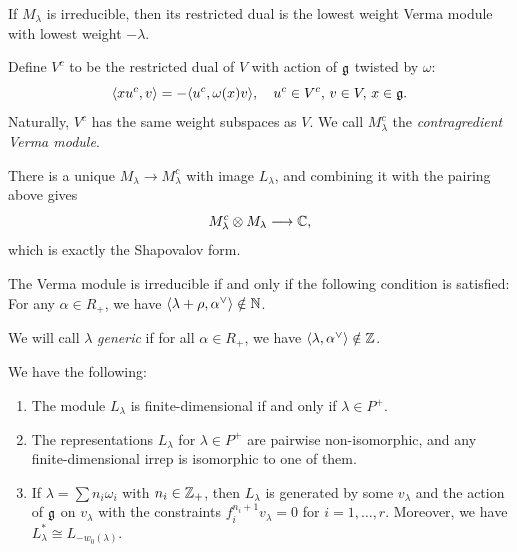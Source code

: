 \begin{prop}
  If $M_\lambda$ is irreducible, then
  its restricted dual is the lowest weight
  Verma module with lowest
  weight $-\lambda$.
\end{prop}

\begin{definition}
  Define
  $V^c$ to be the restricted dual of $V$
  with action of $\mathfrak{g}$ twisted by $\omega$:
  \[
    \langle xu^c, v \rangle
    = -\langle u^c, \omega(x) v \rangle,
    \quad u^c \in V^c,\, v \in V,\, x \in \mathfrak{g}.
  \]
  Naturally, $V^c$
  has the same weight subspaces as
  $V$. We call
  $M_\lambda^c$ the \emph{contragredient
  Verma module}.
\end{definition}

\begin{remark}
  There is a unique
  $M_\lambda \to M_\lambda^c$ with image
  $L_\lambda$, and
  combining it with the pairing above gives
  \[
    M^c_\lambda \otimes M_\lambda \longrightarrow \mathbb{C},
  \]
  which is exactly the Shapovalov form.
\end{remark}

\begin{theorem}
  The Verma module is irreducible if
  and only if the following condition is
  satisfied: For any $\alpha \in R_+$,
  we have
  $\langle \lambda + \rho, \alpha^\vee \rangle \notin \mathbb{N}$.
\end{theorem}

\begin{definition}
  We will call $\lambda$ \emph{generic}
  if for all $\alpha \in R_+$,
  we have $\langle \lambda, \alpha^\vee \rangle \notin \mathbb{Z}$.
\end{definition}

\begin{theorem}
  We have the following:
  \begin{enumerate}
    \item The module $L_\lambda$
      is finite-dimensional if and only if
      $\lambda \in P^+$.
    \item The representations $L_\lambda$
      for $\lambda \in P^+$ are pairwise
      non-isomorphic, and any finite-dimensional
      irrep
      is isomorphic to one of them.
    \item If $\lambda = \sum n_i \omega_i$
      with $n_i \in \mathbb{Z}_+$, then
      $L_\lambda$ is generated by some
      $v_\lambda$ and the action of
      $\mathfrak{g}$ on $v_\lambda$ with the
      constraints
      $f^{n_i + 1}_i v_\lambda = 0$ for
      $i = 1, \dots, r$.
      Moreover, we have
      $L_\lambda^* \cong L_{-w_0(\lambda)}$.
  \end{enumerate}
\end{theorem}

